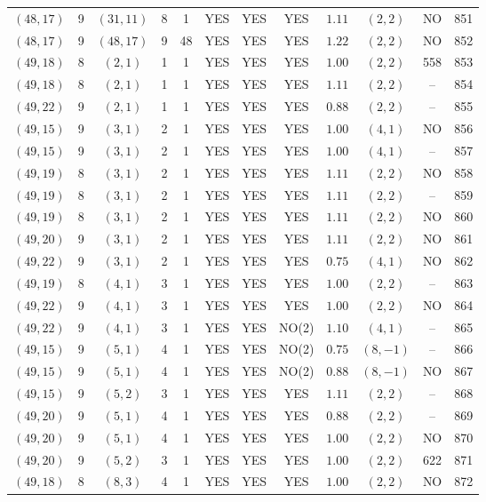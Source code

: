 \begin{longtable}{|c|c|c|c|c|c|c|c|c|c|c|c|}
$(48,17)$ & 9 & $(31,11)$ & 8 & 1 & YES & YES & YES & $1.11$ & $(2,2)$ & NO & 851\\
$(48,17)$ & 9 & $(48,17)$ & 9 & 48 & YES & YES & YES & $1.22$ & $(2,2)$ & NO & 852\\
$(49,18)$ & 8 & $(2,1)$ & 1 & 1 & YES & YES & YES & $1.00$ & $(2,2)$ & 558 & 853\\
$(49,18)$ & 8 & $(2,1)$ & 1 & 1 & YES & YES & YES & $1.11$ & $(2,2)$ & -- & 854\\
$(49,22)$ & 9 & $(2,1)$ & 1 & 1 & YES & YES & YES & $0.88$ & $(2,2)$ & -- & 855\\
$(49,15)$ & 9 & $(3,1)$ & 2 & 1 & YES & YES & YES & $1.00$ & $(4,1)$ & NO & 856\\
$(49,15)$ & 9 & $(3,1)$ & 2 & 1 & YES & YES & YES & $1.00$ & $(4,1)$ & -- & 857\\
$(49,19)$ & 8 & $(3,1)$ & 2 & 1 & YES & YES & YES & $1.11$ & $(2,2)$ & NO & 858\\
$(49,19)$ & 8 & $(3,1)$ & 2 & 1 & YES & YES & YES & $1.11$ & $(2,2)$ & -- & 859\\
$(49,19)$ & 8 & $(3,1)$ & 2 & 1 & YES & YES & YES & $1.11$ & $(2,2)$ & NO & 860\\
$(49,20)$ & 9 & $(3,1)$ & 2 & 1 & YES & YES & YES & $1.11$ & $(2,2)$ & NO & 861\\
$(49,22)$ & 9 & $(3,1)$ & 2 & 1 & YES & YES & YES & $0.75$ & $(4,1)$ & NO & 862\\
$(49,19)$ & 8 & $(4,1)$ & 3 & 1 & YES & YES & YES & $1.00$ & $(2,2)$ & -- & 863\\
$(49,22)$ & 9 & $(4,1)$ & 3 & 1 & YES & YES & YES & $1.00$ & $(2,2)$ & NO & 864\\
$(49,22)$ & 9 & $(4,1)$ & 3 & 1 & YES & YES & NO(2) & $1.10$ & $(4,1)$ & -- & 865\\
$(49,15)$ & 9 & $(5,1)$ & 4 & 1 & YES & YES & NO(2) & $0.75$ & $(8,-1)$ & -- & 866\\
$(49,15)$ & 9 & $(5,1)$ & 4 & 1 & YES & YES & NO(2) & $0.88$ & $(8,-1)$ & NO & 867\\
$(49,15)$ & 9 & $(5,2)$ & 3 & 1 & YES & YES & YES & $1.11$ & $(2,2)$ & -- & 868\\
$(49,20)$ & 9 & $(5,1)$ & 4 & 1 & YES & YES & YES & $0.88$ & $(2,2)$ & -- & 869\\
$(49,20)$ & 9 & $(5,1)$ & 4 & 1 & YES & YES & YES & $1.00$ & $(2,2)$ & NO & 870\\
$(49,20)$ & 9 & $(5,2)$ & 3 & 1 & YES & YES & YES & $1.00$ & $(2,2)$ & 622 & 871\\
$(49,18)$ & 8 & $(8,3)$ & 4 & 1 & YES & YES & YES & $1.00$ & $(2,2)$ & NO & 872\\

\end{longtable}
